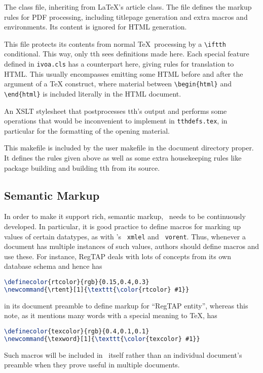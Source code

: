 \documentclass[11pt,a4paper]{ivoa}
\newcommand{\texword}[1]{\texttt{\color{texcolor} #1}}
\begin{document}
\begin{bigdescription}
\item[ivoa.cls] The class file, inheriting from \LaTeX's article class.
The file defines the markup rules for PDF processing, including
titlepage generation and extra macros and environments.  Its content is
ignored for HTML generation.

\item[tthdefs.tex] This file protects its contents from normal \TeX\
processing by a \verb|\iftth| conditional. This way, only tth sees
definitions made here. Each special feature defined in \texttt{ivoa.cls}
has a counterpart here, giving rules for translation to HTML.  This
usually encompasses emitting some HTML before and after the argument of
a TeX construct, where material between \verb|\begin{html}| and
\verb|\end{html}| is included literally in the HTML document.

\item[tth-ivoa.xslt] An XSLT stylesheet that postprocesses tth's output
and performs some operations that would be inconvenient to implement in
\texttt{tthdefs.tex}, in particular for the formatting of the opening
material.

\item[Makefile] This makefile is included by the user makefile in the
document directory proper.  It defines the rules given above as well as
some extra housekeeping rules like package building and building tth
from its source.

\end{bigdescription}

\subsection{Semantic Markup}

In order to make it support rich, semantic markup, \ivoatex\ needs to be
continuously developed.  In particular, it is good practice to define
macros for marking up values of certain datatypes, as with \ivoatex's
\texword{xmlel} and \texword{vorent}.  
Thus, whenever a document has multiple
instances of such values, authors should define macros and use these.
For instance, RegTAP deals with lots of concepts from its own
database schema and hence has
\begin{lstlisting}[language=TeX]
\definecolor{rtcolor}{rgb}{0.15,0.4,0.3}
\newcommand{\rtent}[1]{\texttt{\color{rtcolor} #1}}
\end{lstlisting}
in its document preamble to
define markup for ``RegTAP entity'', whereas
this note, as it mentions many words with a special meaning to \TeX, has
\begin{lstlisting}[language=TeX]
\definecolor{texcolor}{rgb}{0.4,0.1,0.1}
\newcommand{\texword}[1]{\texttt{\color{texcolor} #1}}
\end{lstlisting}
Such macros will be included in \ivoatex\ itself rather than an
individual document's preamble when they prove useful in multiple
documents.
\end{document}
